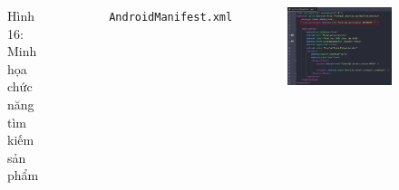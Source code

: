 \documentclass{beamer}
\begin{document}
\begin{frame}
\begin{columns}
\begin{figure}
            \caption{\centering\tiny{Hình 16: Minh họa chức năng tìm kiếm sản phẩm}}
        \end{figure}
        \indent \texttt{AndroidManifest.xml}
        \begin{figure}
            \centering
            \includegraphics[width=\textwidth]{images/42.png}
        \end{figure}
    \end{columns}
\end{frame}
\end{document}
